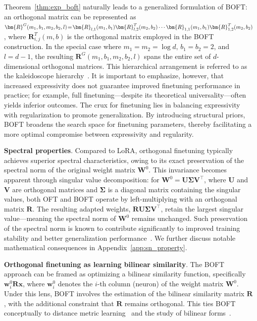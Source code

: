 Theorem~\ref{thm:exp_boft} naturally leads to a generalized formulation of BOFT: an orthogonal matrix can be represented as $\thickmuskip=2mu \medmuskip=2mu \bm{R}^G(m_1,b_1,m_2,b_2,l)=\bm{R}_{l,1}(m_1,b_1)\bm{R}_{l,2}^T(m_2,b_2)\cdots\bm{R}_{1,1}(m_1,b_1)\bm{R}_{1,2}^T(m_2,b_2)$, where $\bm{R}_{i,j}^T(m,b)$ is the orthogonal matrix employed in the BOFT construction. In the special case where $m_1=m_2=\log d$, $b_1=b_2=2$, and $l=d-1$, the resulting $\bm{R}^G(m_1,b_1,m_2,b_2,l)$ spans the entire set of $d$-dimensional orthogonal matrices. This hierarchical arrangement is referred to as the kaleidoscope hierarchy~\cite{dao2019kaleidoscope}. It is important to emphasize, however, that increased expressivity does not guarantee improved finetuning performance in practice; for example, full finetuning—despite its theoretical universality—often yields inferior outcomes. The crux for finetuning lies in balancing expressivity with regularization to promote generalization. By introducing structural priors, BOFT broadens the search space for finetuning parameters, thereby facilitating a more optimal compromise between expressivity and regularity.

\textbf{Spectral properties}. Compared to LoRA, orthogonal finetuning typically achieves superior spectral characteristics, owing to its exact preservation of the spectral norm of the original weight matrix $\bm{W}^0$. This invariance becomes apparent through singular value decomposition: for $\bm{W}^0=\bm{U}\bm{\Sigma}\bm{V}^\top$, where $\bm{U}$ and $\bm{V}$ are orthogonal matrices and $\bm{\Sigma}$ is a diagonal matrix containing the singular values, both OFT and BOFT operate by left-multiplying with an orthogonal matrix $\bm{R}$. The resulting adapted weights, $\bm{R}\bm{U}\bm{\Sigma}\bm{V}^\top$, retain the largest singular value—meaning the spectral norm of $\bm{W}^0$ remains unchanged. Such preservation of the spectral norm is known to contribute significantly to improved training stability and better generalization performance~\cite{miyato2018spectral,yoshida2017spectral}. We further discuss notable mathematical consequences in Appendix~\ref{app:sn_property}.

\textbf{Orthogonal finetuning as learning bilinear similarity}. The BOFT approach can be framed as optimizing a bilinear similarity function, specifically $\bm{w}^0_i\bm{R}\bm{x}$, where $\bm{w}^0_i$ denotes the $i$-th column (neuron) of the weight matrix $\bm{W}^0$. Under this lens, BOFT involves the estimation of the bilinear similarity matrix $\bm{R}$, with the additional constraint that $\bm{R}$ remains orthogonal. This ties BOFT conceptually to distance metric learning~\cite{xing2002distance} and the study of bilinear forms~\cite{roman2005advanced}.

